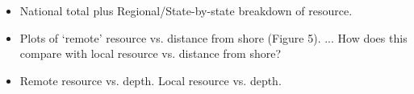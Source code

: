 \begin{itemize}
\item National total plus Regional/State-by-state breakdown of resource.
\item Plots of ‘remote’ resource vs. distance from shore (Figure 5). ... How does this compare with local resource vs. distance from shore?
\item Remote resource vs. depth. Local resource vs. depth.
\end{itemize}
